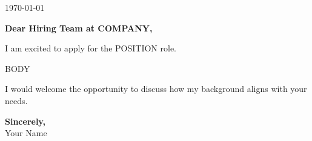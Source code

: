 \documentclass[11pt,letterpaper]{article}
\begin{document}
\begin{flushright}
  \today
\end{flushright}

\vspace{12pt}

\textbf{Dear Hiring Team at {{COMPANY}},}

\vspace{8pt}

I am excited to apply for the {{POSITION}} role.

{{BODY}}

I would welcome the opportunity to discuss how my background aligns with your needs.

\vspace{16pt}

\textbf{Sincerely,}\\
Your Name
\end{document}
